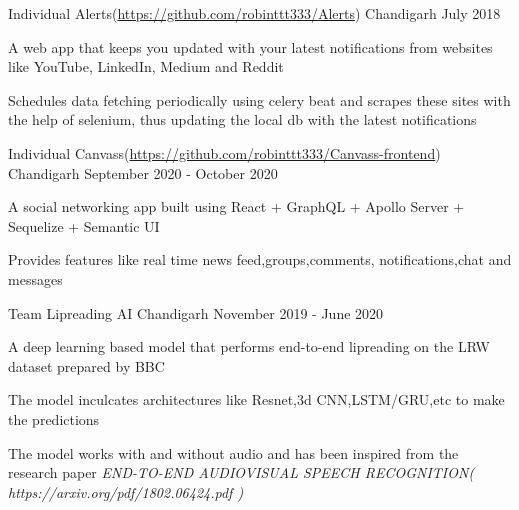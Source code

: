 


\begin{cventries}

\cventry
{Individual} %
{Alerts(\url{https://github.com/robinttt333/Alerts})} %
{Chandigarh} %
{July 2018 } %
{ %
\begin{cvitems}
\item {A web app that keeps you updated with your latest notifications from websites like YouTube, LinkedIn, Medium and Reddit}
\item {Schedules data fetching periodically using celery beat and scrapes these sites with the help of selenium, thus updating the local db with the latest notifications}
\end{cvitems}
}

\cventry
{Individual} %
{Canvass(\url{https://github.com/robinttt333/Canvass-frontend})} %
{Chandigarh} %
{September 2020 - October 2020 } %
{ %
\begin{cvitems}
\item {A social networking app built using React + GraphQL + Apollo Server + Sequelize + Semantic UI}
\item{Provides features like real time news feed,groups,comments, notifications,chat and messages}
\end{cvitems}
}


\cventry
{Team} %
{Lipreading AI} %
{Chandigarh} %
{November 2019 - June 2020} %
{ %
\begin{cvitems}
\item {A deep learning based model that performs end-to-end lipreading on the LRW dataset prepared by BBC}
\item {The model inculcates architectures like Resnet,3d CNN,LSTM/GRU,etc to make the predictions}
\item {The model works with and without audio and has been inspired from the research paper \emph{END-TO-END AUDIOVISUAL SPEECH RECOGNITION( https://arxiv.org/pdf/1802.06424.pdf )}}
\end{cvitems}
}


\end{cventries}
